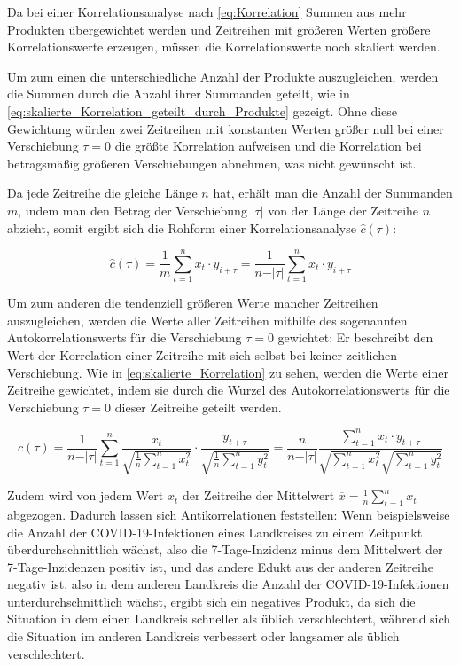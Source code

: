 Da bei einer Korrelationsanalyse nach \autoref{eq:Korrelation} Summen aus mehr Produkten übergewichtet werden und Zeitreihen mit größeren Werten größere Korrelationswerte erzeugen, müssen die Korrelationswerte noch skaliert werden.

Um zum einen die unterschiedliche Anzahl der Produkte auszugleichen, werden die Summen durch die Anzahl ihrer Summanden geteilt, wie in \autoref{eq:skalierte_Korrelation_geteilt_durch_Produkte} gezeigt. Ohne diese Gewichtung würden zwei Zeitreihen mit konstanten Werten größer null bei einer Verschiebung $\tau=0$ die größte Korrelation aufweisen und die Korrelation bei betragsmäßig größeren Verschiebungen abnehmen, was nicht gewünscht ist.

Da jede Zeitreihe die gleiche Länge $n$ hat, erhält man die Anzahl der Summanden $m$, indem man
den Betrag der Verschiebung $\vert\tau\vert$
von der Länge der Zeitreihe $n$ abzieht, somit ergibt sich die Rohform einer Korrelationsanalyse $\hat{c}(\tau)$:

\begin{equation}\label{eq:skalierte_Korrelation_geteilt_durch_Produkte}
    \hat{c}(\tau) =\frac{1}{m} \sum_{t=1}^n x_t\cdot y_{i+\tau}=\frac{1}{n-\vert\tau\vert} \sum_{t=1}^n x_t\cdot y_{i+\tau}
\end{equation}

Um zum anderen die tendenziell größeren Werte mancher Zeitreihen auszugleichen, werden die Werte aller Zeitreihen mithilfe des sogenannten \glqq{}Autokorrelationswerts für die Verschiebung $\tau=0$ gewichtet: Er beschreibt den Wert der Korrelation einer Zeitreihe mit sich selbst bei keiner zeitlichen Verschiebung. Wie in \autoref{eq:skalierte_Korrelation} zu sehen, werden die Werte einer Zeitreihe gewichtet, indem sie durch die Wurzel des Autokorrelationswerts für die Verschiebung $\tau=0$ dieser Zeitreihe geteilt werden.

\begin{equation}\label{eq:skalierte_Korrelation}
    c(\tau) =
    \frac{1}{n-\vert\tau\vert}
    \sum_{t=1}^n
    \frac{x_t}{\sqrt{\frac{1}{n}\sum_{t=1}^n x_t^2}}
    \cdot
    \frac{y_{t+\tau}}{\sqrt{\frac{1}{n}\sum_{t=1}^n y_t^2}}
    =
    \frac{n}{n-\vert\tau\vert}
    \frac{\sum_{t=1}^n x_t \cdot y_{t+\tau}}
    {\sqrt{\sum_{t=1}^n x_t^2}
    \sqrt{\sum_{t=1}^n y_t^2}}
\end{equation}


Zudem wird von jedem Wert $x_t$ der Zeitreihe der Mittelwert $\overline x = \frac{1}{n}\sum_{t=1}^n x_t$ abgezogen. Dadurch lassen sich Antikorrelationen feststellen: Wenn beispielsweise die Anzahl der COVID-19-Infektionen eines Landkreises zu einem Zeitpunkt überdurchschnittlich wächst, also die 7-Tage-Inzidenz minus dem Mittelwert der 7-Tage-Inzidenzen positiv ist, und das andere Edukt aus der anderen Zeitreihe negativ ist, also in dem anderen Landkreis die Anzahl der COVID-19-Infektionen unterdurchschnittlich wächst, ergibt sich ein negatives Produkt, da sich die Situation in dem einen Landkreis  schneller als üblich verschlechtert, während sich die Situation im anderen Landkreis verbessert oder langsamer als üblich verschlechtert.

